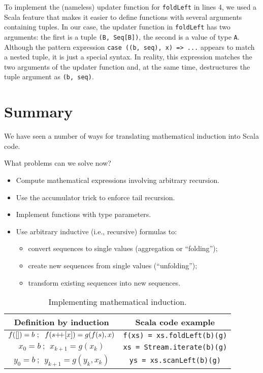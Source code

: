\noindent To implement the (nameless) updater function for \lstinline!foldLeft!
in lines 4, we used a Scala feature that makes it easier
to define functions with several arguments containing tuples. In our
case, the updater function in \lstinline!foldLeft! has two arguments:
the first is a tuple \lstinline!(B, Seq[B])!, the second is a value
of type \lstinline!A!. Although the pattern expression \lstinline!case ((b, seq), x) => ...!
appears to match a nested tuple,
it is just a special syntax. In reality, this expression matches the
two arguments of the updater function and, at the same time, destructures
the tuple argument as \lstinline!(b, seq)!. 

\section{Summary}

We have seen a number of ways for translating mathematical induction
into Scala code.

What problems can we solve now?
\begin{itemize}
\item Compute mathematical expressions involving arbitrary recursion.
\item Use the accumulator trick to enforce tail recursion.
\item Implement functions with type parameters.
\item Use arbitrary inductive (i.e., recursive) formulas to:
\begin{itemize}
\item convert sequences to single values (aggregation or \textsf{``}folding\textsf{''});
\item create new sequences from single values (\textsf{``}unfolding\textsf{''});
\item transform existing sequences into new sequences.
\end{itemize}
\end{itemize}
\begin{wraptable}{l}{0.59\columnwidth}%
\begin{centering}
\vspace{-0.5\baselineskip}
\begin{tabular}{|c|c|}
\hline 
\textbf{\small{}Definition by induction} & \textbf{\small{}Scala code example}\tabularnewline
\hline 
\hline 
{\small{}$f(\left[\right])=b~;~~f(s{\displaystyle }{+\negmedspace+}[x])=g(f(s),x)$} & {\small{}}\lstinline!f(xs) = xs.foldLeft(b)(g)!\tabularnewline
\hline 
{\small{}$x_{0}=b~;~~x_{k+1}=g(x_{k})$} & {\small{}}\lstinline!xs = Stream.iterate(b)(g)!\tabularnewline
\hline 
{\small{}$y_{0}=b~;~~y_{k+1}=g(y_{k},x_{k})$} & {\small{}}\lstinline!ys = xs.scanLeft(b)(g)!\tabularnewline
\hline 
\end{tabular}
\par\end{centering}
\caption{Implementing mathematical induction.\label{tab:Implementing-mathematical-induction}}
\vspace{-0.75\baselineskip}
\end{wraptable}%

